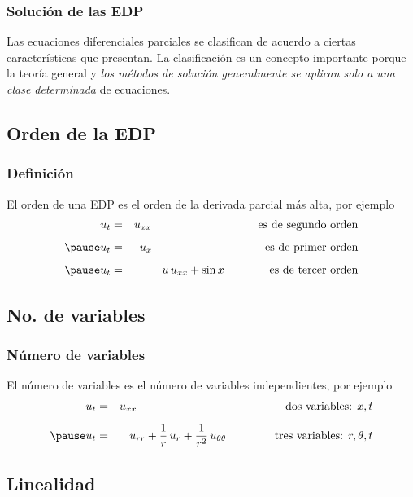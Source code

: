 \documentclass[12pt]{beamer}
\begin{document}
\begin{frame}
\frametitle{Solución de las EDP}
Las ecuaciones diferenciales parciales se clasifican de acuerdo a ciertas características que presentan. La clasificación es un concepto importante porque la teoría general y \emph{los métodos de solución generalmente se aplican solo a una clase determinada} de ecuaciones.
\end{frame}
\subsection*{Orden de la EDP}
\begin{frame}
\frametitle{Definición}
El orden de una EDP es el orden de la derivada parcial más alta, por ejemplo
\begin{eqnarray*}
u_{t} &=& u_{xx} \hspace{3.3cm} \mbox{es de segundo orden} \\[0.5em] \pause
u_{t} &=& u_{x} \hspace{3.5cm} \mbox{es de primer orden} \\[0.5em] \pause
u_{t} &=& u \, u_{xx} + \sin x \hspace{1.4cm} \mbox{es de tercer orden}
\end{eqnarray*}
\end{frame}

\subsection*{No. de variables}

\begin{frame}
\frametitle{Número de variables}
El número de variables es el número de variables independientes, por ejemplo
\begin{eqnarray*}
u_{t} &=& u_{xx} \hspace{3cm} \hspace{1.61cm} \mbox{dos variables: } x, t \\[0.5em] \pause
u_{t} &=& u_{rr} + \dfrac{1}{r} \, u_{r} + \dfrac{1}{r^{2}} \, u_{\theta \theta} \hspace{1.5cm} \mbox{tres variables: } r, \theta, t
\end{eqnarray*}
\end{frame}

\subsection*{Linealidad}
\end{document}
